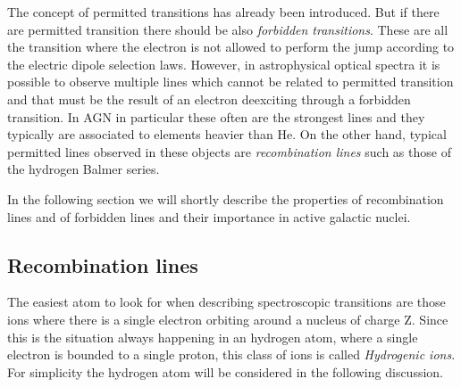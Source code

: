 \documentclass[../main.tex]{subfiles}
\begin{document}
The concept of permitted transitions has already been introduced.
But if there are permitted transition there should be also \emph{forbidden transitions}.
These are all the transition where the electron is not allowed to perform the jump according to the electric dipole selection laws.
However, in astrophysical optical spectra it is possible to observe multiple lines which cannot be related to permitted transition and that must be the result of an electron deexciting through a forbidden transition.
In AGN in particular these often are the strongest lines and they typically are associated to elements heavier than He.
On the other hand, typical permitted lines observed in these objects are \emph{recombination lines} such as those of the hydrogen Balmer series.

In the following section we will shortly describe the properties of recombination lines and of forbidden lines and their importance in active galactic nuclei.

\subsection{Recombination lines}

The easiest atom to look for when describing spectroscopic transitions are those ions where 
there is a single electron orbiting around a nucleus of charge Z.
Since this is the situation always happening in an hydrogen atom, where a single electron is bounded to a single proton, this class of ions is called \emph{Hydrogenic ions}.
For simplicity the hydrogen atom will be considered in the following discussion.
\end{document}
